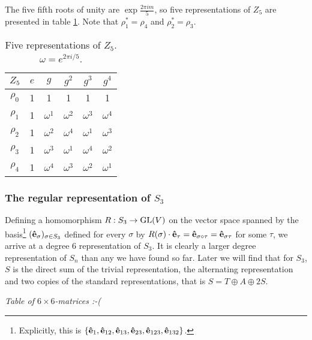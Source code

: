 		\begin{example}
			The five fifth roots of unity are $\exp{\frac{2\pi im}{5}}$, so five representations of $Z_5$ are presented in table \ref{table:Z5}. Note that $\rho_1^* = \rho_4$ and $\rho_2^* = \rho_3$.
			
			\begin{table}[hbt!]
				\begin{tabular}{c | c c c c c}
					\label{table:Z5}
					$Z_5$ & $e$ & $g$        & $g^2$      & $g^3$      & $g^4$      \\ \hline
					$\rho_0$            & 1   & 1          & 1          & 1          & 1          \\
					$\rho_1$            & 1   & $\omega^1$ & $\omega^2$ & $\omega^3$ & $\omega^4$ \\
					$\rho_2$            & 1   & $\omega^2$ & $\omega^4$ & $\omega^1$ & $\omega^3$ \\
					$\rho_3$            & 1   & $\omega^3$ & $\omega^1$ & $\omega^4$ & $\omega^2$ \\
					$\rho_4$            & 1   & $\omega^4$ & $\omega^3$ & $\omega^2$ & $\omega^1$
				\end{tabular}
				\centering
				\caption{Five representations of $Z_5$. $\omega = e^{2 \pi i/5}$.}
			\end{table}
		\end{example}
		
	\subsubsection{The regular representation of $S_3$}\label{sect:regS3}
	
		Defining a homomorphism $R: S_3 \rightarrow \text{GL}(V)$ on the vector space spanned by the basis\footnote{Explicitly, this is $\left\lbrace \mathbf{\hat{e}}_1, \mathbf{\hat{e}}_{12}, \mathbf{\hat{e}}_{13}, \mathbf{\hat{e}}_{23}, \mathbf{\hat{e}}_{123}, \mathbf{\hat{e}}_{132} \right\rbrace$.} $(\mathbf{\hat{e}}_{\sigma})_{\sigma \in S_3}$ defined for every $\sigma$ by $R(\sigma) \cdot \mathbf{\hat{e}}_\tau = \mathbf{\hat{e}}_{\sigma \circ \tau} = \mathbf{\hat{e}}_{\sigma\tau}$ for some $\tau$, we arrive at a degree 6 representation of $S_3$. It is clearly a larger degree representation of $S_n$ than any we have found so far. Later we will find that for $S_3$, $S$ is the direct sum of the trivial representation, the alternating representation and two copies of the standard representations, that is $S = T \oplus A \oplus 2S$.
		
		\textit{Table of $6 \times 6$-matrices :-(}

		
			
			